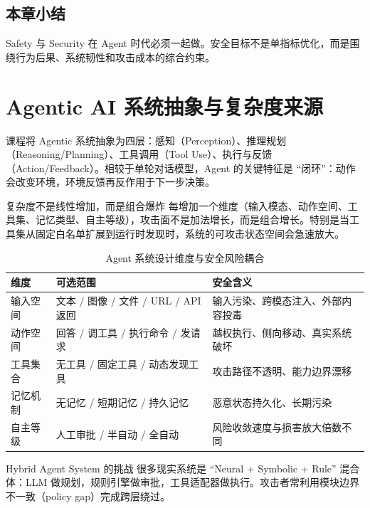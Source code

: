 \documentclass[a4paper]{article}
\begin{document}
\subsection{本章小结}
Safety 与 Security 在 Agent 时代必须一起做。安全目标不是单指标优化，而是围绕行为后果、系统韧性和攻击成本的综合约束。

\section{Agentic AI 系统抽象与复杂度来源}

课程将 Agentic 系统抽象为四层：感知（Perception）、推理规划（Reasoning/Planning）、工具调用（Tool Use）、执行与反馈（Action/Feedback）。相较于单轮对话模型，Agent 的关键特征是 ``闭环''：动作会改变环境，环境反馈再反作用于下一步决策。

\begin{importantbox}{复杂度不是线性增加，而是组合爆炸}
每增加一个维度（输入模态、动作空间、工具集、记忆类型、自主等级），攻击面不是加法增长，而是组合增长。特别是当工具集从固定白名单扩展到运行时发现时，系统的可攻击状态空间会急速放大。
\end{importantbox}

\begin{table}[H]
\centering
\begin{tabular}{p{2.2cm}p{4.2cm}p{4.5cm}}
\toprule
\textbf{维度} & \textbf{可选范围} & \textbf{安全含义} \\
\midrule
输入空间 & 文本 / 图像 / 文件 / URL / API 返回 & 输入污染、跨模态注入、外部内容投毒 \\
动作空间 & 回答 / 调工具 / 执行命令 / 发请求 & 越权执行、侧向移动、真实系统破坏 \\
工具集合 & 无工具 / 固定工具 / 动态发现工具 & 攻击路径不透明、能力边界漂移 \\
记忆机制 & 无记忆 / 短期记忆 / 持久记忆 & 恶意状态持久化、长期污染 \\
自主等级 & 人工审批 / 半自动 / 全自动 & 风险收敛速度与损害放大倍数不同 \\
\bottomrule
\end{tabular}
\caption{Agent 系统设计维度与安全风险耦合}
\end{table}

\begin{knowledgebox}{Hybrid Agent System 的挑战}
很多现实系统是 ``Neural + Symbolic + Rule'' 混合体：LLM 做规划，规则引擎做审批，工具适配器做执行。攻击者常利用模块边界不一致（policy gap）完成跨层绕过。
\end{knowledgebox}
\end{document}
